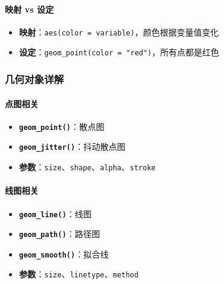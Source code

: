\documentclass[
]{book}
\providecommand{\tightlist}{%
  \setlength{\itemsep}{0pt}\setlength{\parskip}{0pt}}
\begin{document}
\hypertarget{ux6620ux5c04-vs-ux8bbeux5b9a}{%
\paragraph{映射 vs 设定}\label{ux6620ux5c04-vs-ux8bbeux5b9a}}

\begin{itemize}
\tightlist
\item
  \textbf{映射}：\texttt{aes(color\ =\ variable)}，颜色根据变量值变化
\item
  \textbf{设定}：\texttt{geom\_point(color\ =\ "red")}，所有点都是红色
\end{itemize}

\hypertarget{ux51e0ux4f55ux5bf9ux8c61ux8be6ux89e3}{%
\subsubsection{几何对象详解}\label{ux51e0ux4f55ux5bf9ux8c61ux8be6ux89e3}}

\hypertarget{ux70b9ux56feux76f8ux5173}{%
\paragraph{点图相关}\label{ux70b9ux56feux76f8ux5173}}

\begin{itemize}
\tightlist
\item
  \textbf{\texttt{geom\_point()}}：散点图
\item
  \textbf{\texttt{geom\_jitter()}}：抖动散点图
\item
  \textbf{参数}：\texttt{size}、\texttt{shape}、\texttt{alpha}、\texttt{stroke}
\end{itemize}

\hypertarget{ux7ebfux56feux76f8ux5173}{%
\paragraph{线图相关}\label{ux7ebfux56feux76f8ux5173}}

\begin{itemize}
\tightlist
\item
  \textbf{\texttt{geom\_line()}}：线图
\item
  \textbf{\texttt{geom\_path()}}：路径图
\item
  \textbf{\texttt{geom\_smooth()}}：拟合线
\item
  \textbf{参数}：\texttt{size}、\texttt{linetype}、\texttt{method}
\end{itemize}
\end{document}
